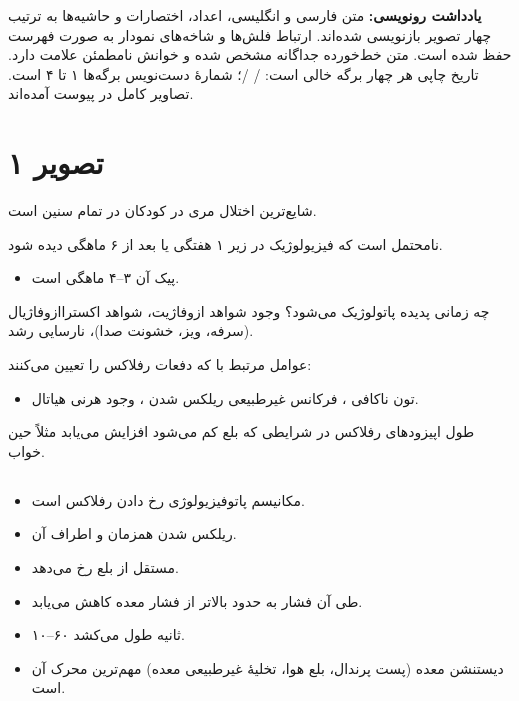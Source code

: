 \documentclass[12pt,a4paper]{article}
\begin{document}
\fi
\providecommand{\GERDPage}[1]{\clearpage\section*{تصویر #1}}
\providecommand{\GERDUnclear}[1]{\textbf{[خوانش نامطمئن: #1]}}
\providecommand{\GERDArrow}{\lr{\(\longleftarrow\)}}
\providecommand{\GERDImagePath}{images/}
\IfFileExists{images/pic01.jpg}{}{%
  \renewcommand{\GERDImagePath}{pediatrics/ped-gastroenterology/GERD/images/}}

\begin{center}
{\Large\bfseries {}}\par
{}
\end{center}
\textbf{یادداشت رونویسی:} متن فارسی و انگلیسی، اعداد، اختصارات و حاشیه‌ها به ترتیب چهار تصویر بازنویسی شده‌اند. ارتباط فلش‌ها و شاخه‌های نمودار به صورت فهرست حفظ شده است. متن خط‌خورده جداگانه مشخص شده و خوانش نامطمئن علامت دارد. تاریخ چاپی هر چهار برگه خالی است: / /؛ شمارهٔ دست‌نویس برگه‌ها ۱ تا ۴ است. تصاویر کامل در پیوست آمده‌اند.

\section*{تصویر ۱}
 شایع‌ترین اختلال مری در کودکان در تمام سنین است.

نامحتمل است که  فیزیولوژیک در زیر ۱ هفتگی یا بعد از ۶ ماهگی دیده شود.
\begin{itemize}
\item پیک آن ۳–۴ ماهگی است.
\end{itemize}

چه زمانی پدیده پاتولوژیک می‌شود؟ \GERDArrow{} وجود شواهد ازوفاژیت، شواهد اکستراازوفاژیال (سرفه، ویز، خشونت صدا)، نارسایی رشد.

عوامل مرتبط با  که دفعات رفلاکس را تعیین می‌کنند:
\begin{itemize}
\item تون ناکافی ، فرکانس غیرطبیعی ریلکس شدن ، وجود هرنی هیاتال.
\end{itemize}
طول اپیزودهای رفلاکس در شرایطی که بلع کم می‌شود افزایش می‌یابد \GERDArrow{} مثلاً حین خواب.

\subsection*{}
\begin{itemize}
\item مکانیسم پاتوفیزیولوژی رخ دادن رفلاکس است.
\item ریلکس شدن همزمان  و  اطراف آن.
\item مستقل از بلع رخ می‌دهد.
\item طی آن فشار  به حدود  بالاتر از فشار معده کاهش می‌یابد.
\item ۱۰–۶۰ ثانیه طول می‌کشد.
\item دیستنشن معده (پست پرندال، بلع هوا، تخلیهٔ غیرطبیعی معده) مهم‌ترین محرک آن است.
\end{itemize}
\end{document}
